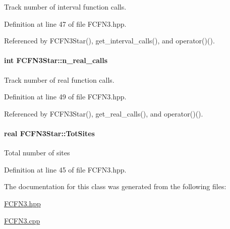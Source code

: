 \-Track number of interval function calls. 



\-Definition at line 47 of file \-F\-C\-F\-N3.\-hpp.



\-Referenced by \-F\-C\-F\-N3\-Star(), get\-\_\-interval\-\_\-calls(), and operator()().

\hypertarget{classFCFN3Star_a1f84d41d7101ffe0d1485f414065d09e}{
\paragraph[{n\-\_\-real\-\_\-calls}]{\setlength{\rightskip}{0pt plus 5cm}int {\bf \-F\-C\-F\-N3\-Star\-::n\-\_\-real\-\_\-calls}}}\label{classFCFN3Star_a1f84d41d7101ffe0d1485f414065d09e}


\-Track number of real function calls. 



\-Definition at line 49 of file \-F\-C\-F\-N3.\-hpp.



\-Referenced by \-F\-C\-F\-N3\-Star(), get\-\_\-real\-\_\-calls(), and operator()().

\hypertarget{classFCFN3Star_a1d596a2072a382eb4e11d99bca03b81d}{
\paragraph[{\-Tot\-Sites}]{\setlength{\rightskip}{0pt plus 5cm}real {\bf \-F\-C\-F\-N3\-Star\-::\-Tot\-Sites}}}\label{classFCFN3Star_a1d596a2072a382eb4e11d99bca03b81d}
\-Total number of sites 

\-Definition at line 45 of file \-F\-C\-F\-N3.\-hpp.



\-The documentation for this class was generated from the following files\-:\begin{DoxyCompactItemize}
\item 
\hyperlink{FCFN3_8hpp}{\-F\-C\-F\-N3.\-hpp}\item 
\hyperlink{FCFN3_8cpp}{\-F\-C\-F\-N3.\-cpp}\end{DoxyCompactItemize}
